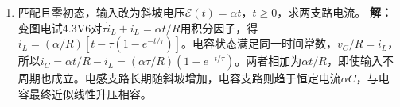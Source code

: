 \documentclass[UTF8,fontset=fandol,a4paper,11pt]{ctexart}
\begin{document}
\begin{enumerate}
\item 匹配且零初态，输入改为斜坡电压$\mathcal E(t)=\alpha t$，$t\ge0$，求两支路电流。
\textbf{解：}变图电试4.3V6对$\tau\dot i_L+i_L=\alpha t/R$用积分因子，得$i_L=(\alpha/R)[t-\tau(1-e^{-t/\tau})]$。电容状态满足同一时间常数，$v_C/R=i_L$，所以$i_C=\alpha t/R-i_L=(\alpha\tau/R)(1-e^{-t/\tau})$。两者相加为$\alpha t/R$，即使输入不周期也成立。电感支路长期随斜坡增加，电容支路则趋于恒定电流$\alpha C$，与电容最终近似线性升压相容。
\begin{center}\begin{minipage}{.98\linewidth}\centering
{}
\end{minipage}
\end{center}
\end{enumerate}
\end{document}

